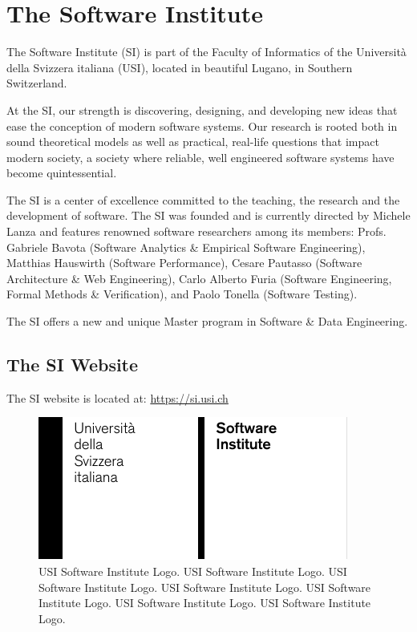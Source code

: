 \section{The Software Institute}

The Software Institute (SI) is part of the Faculty of Informatics of the Universit\`a della Svizzera italiana (USI), located in beautiful Lugano, in Southern Switzerland.

At the SI, our strength is discovering, designing, and developing new ideas that ease the conception of modern software systems. Our research is rooted both in sound theoretical models as well as practical, real-life questions that impact modern society, a society where reliable, well engineered software systems have become quintessential.

The SI is a center of excellence committed to the teaching, the research and the development of software. The SI was founded and is currently directed by Michele Lanza and features renowned software researchers among its members: Profs. Gabriele Bavota (Software Analytics \& Empirical Software Engineering), Matthias Hauswirth (Software Performance), Cesare Pautasso (Software Architecture \& Web Engineering), Carlo Alberto Furia (Software Engineering, Formal Methods \& Verification), and Paolo Tonella (Software Testing).

The SI offers a new and unique Master program in Software \& Data Engineering.

\subsection{The SI Website}

The SI website is located at: \url{https://si.usi.ch}

\begin{figure}[ht]
\centering
\includegraphics[width=0.75\linewidth]{Grid-System-USI-Software.pdf}
\caption{USI Software Institute Logo. USI Software Institute Logo. USI Software Institute Logo. USI Software Institute Logo. USI Software Institute Logo. USI Software Institute Logo. USI Software Institute Logo.}
\end{figure}

